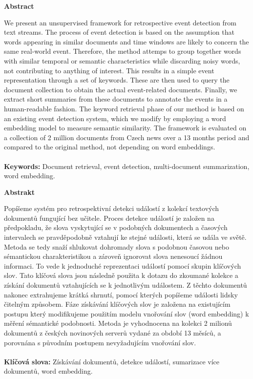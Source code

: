 \thispagestyle{plain}

\begin{center}
	\Large
	\textbf{Abstract}
\end{center}

We present an unsupervised framework for retrospective event detection from text streams. The process of event detection is based on the assumption that words appearing in similar documents and time windows are likely to concern the same real-world event. Therefore, the method attemps to group together words with similar temporal or semantic characteristics while discarding noisy words, not contributing to anything of interest. This results in a simple event representation through a set of keywords. These are then used to query the document collection to obtain the actual event-related documents. Finally, we extract short summaries from these documents to annotate the events in a human-readable fashion. The keyword retrieval phase of our method is based on an existing event detection system, which we modify by employing a word embedding model to measure semantic similarity. The framework is evaluated on a collection of 2 million documents from Czech news over a 13 months period and compared to the original method, not depending on word embeddings.
\\
\\
\textbf{Keywords:} Document retrieval, event detection, multi-document summarization, word embedding.

\hfill

\begin{center}
	\Large
	\textbf{Abstrakt}
\end{center}


Popíšeme systém pro retrospektivní detekci událostí z kolekcí textových dokumentů fungující bez učitele. Proces detekce událostí je založen na předpokladu, že slova vyskytující se v podobných dokumentech a časových intervalech se pravděpodobně vztahují ke stejné události, která se udála ve světě. Metoda se tedy snaží shlukovat dohromady slova s podobnou časovou nebo sémantickou charakteristikou a zároveň ignorovat slova nenesoucí žádnou informaci. To vede k jednoduché reprezentaci událostí pomocí skupin klíčových slov. Tato klíčová slova jsou následně použita k dotazu do zkoumané kolekce a získání dokumentů vztahujících se k jednotlivým událostem. Z těchto dokumentů nakonec extrahujeme krátká shrnutí, pomocí kterých popíšeme události lidsky čitelným způsobem. Fáze získávání klíčových slov je založena na existujícím postupu který modifikujeme použitím modelu vnořování slov (word embedding) k měření sémantické podobnosti. Metoda je vyhodnocena na kolekci 2 milionů dokumentů z českých novinových serverů vydané za období 13 měsíců, a porovnána s původním postupem nevyžadujícím vnořování slov.
\\
\\
\textbf{Klíčová slova:} Získávání dokumentů, detekce událostí, sumarizace více dokumentů, word embedding.